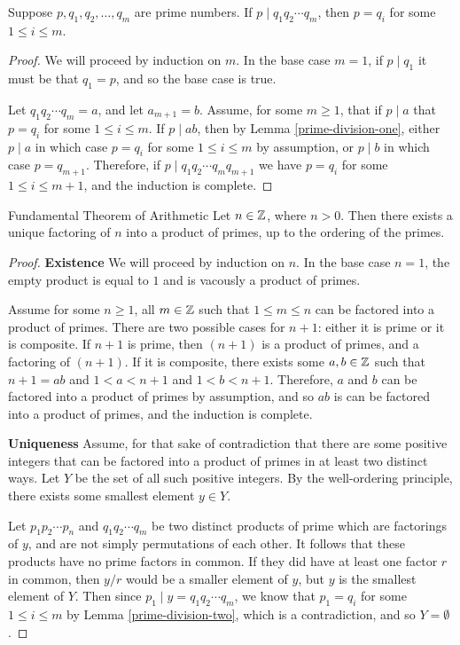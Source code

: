 \begin{lemma}\label{prime-division-two}
    Suppose $p, q_1, q_2, \ldots, q_m$ are prime numbers. If $p \mid q_1q_2\cdots q_m$, then $p = q_i$ for some $1 \leq i \leq m$.
\end{lemma}

\begin{proof}
    We will proceed by induction on $m$. In the base case $m = 1$, if $p\mid q_1$ it must be that $q_1 = p$, and so the base case is true.

    Let $q_1q_2\cdots q_m = a$, and let $a_{m+1} = b$. Assume, for some $m \geq 1$, that if $p \mid a$ that $p = q_i$ for some $1 \leq i \leq m$. If $p \mid ab$, then by Lemma \ref{prime-division-one}, either $p \mid a$ in which case $p = q_i$ for some $1 \leq i \leq m$ by assumption, or  $p \mid b$ in which case $p = q_{m+1}$. Therefore, if $p \mid q_1q_2\cdots q_mq_{m+1}$ we have $p = q_i$ for some $1 \leq i \leq m+1$, and the induction is complete.
\end{proof}

\begin{thm}\label{fundmental-theorem-arithmetic}Fundamental Theorem of Arithmetic\proofbreak
    Let $n \in \mathbb{Z}$, where $n > 0$. Then there exists a unique factoring of $n$ into a product of primes, up to the ordering of the primes.
\end{thm}

\begin{proof}\proofbreak
\textbf{Existence} We will proceed by induction on $n$. In the base case $n=1$, the empty product is equal to $1$ and is vacously a product of primes.

Assume for some $n \geq 1$, all $m \in \mathbb{Z}$ such that $1 \leq m \leq n$ can be factored into a product of primes. There are two possible cases for $n+1$: either it is prime or it is composite. If $n+1$ is prime, then $(n+1)$ is a product of primes, and a factoring of $(n+1)$. If it is composite, there exists some $a, b \in \mathbb{Z}$ such that $n+1 = ab$ and $1 < a < n+1$ and $1 < b < n+1$. Therefore, $a$ and $b$ can be factored into a product of primes by assumption, and so $ab$ is can be factored into a product of primes, and the induction is complete.

\textbf{Uniqueness} Assume, for that sake of contradiction that there are some positive integers that can be factored into a product of primes in at least two distinct ways. Let $Y$ be the set of all such positive integers. By the well-ordering principle, there exists some smallest element $y \in Y$.

Let $p_1p_2\cdots p_n$ and $q_1q_2\cdots q_m$ be two distinct products of prime which are factorings of $y$, and are not simply permutations of each other. It follows that these products have no prime factors in common. If they did have at least one factor $r$ in common, then $y/r$ would be a smaller element of $y$, but $y$ is the smallest element of $Y$. Then since $p_1 \mid y = q_1q_2\cdots q_m$, we know that $p_1 = q_i$ for some $1 \leq i \leq m$ by Lemma \ref{prime-division-two}, which is a contradiction, and so $Y = \emptyset$.
\end{proof}

